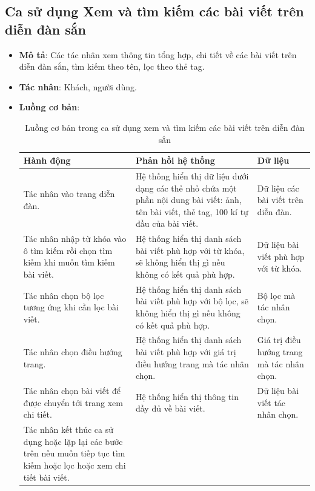 \documentclass[./../main.tex]{subfiles}
\begin{document}
\subsection{Ca sử dụng Xem và tìm kiếm các bài viết trên diễn đàn sắn}
\begin{itemize}
    \item \textbf{Mô tả}: Các tác nhân xem thông tin tổng hợp, chi tiết về các bài viết trên diễn đàn sắn, tìm kiếm theo tên, lọc theo thẻ tag.
    \item \textbf{Tác nhân}: Khách, người dùng.
    \item \textbf{Luồng cơ bản}:
    \begin{table}[H]
    \caption{\label{uc-28}Luồng cơ bản trong ca sử dụng xem và tìm kiếm các bài viết trên diễn đàn sắn}
    \begin{tabularx}{\textwidth}{| X | X | X |}
        \hline
        \textbf{Hành động} & \textbf{Phản hồi hệ thống} & \textbf{Dữ liệu} \\ \hline
        Tác nhân vào trang diễn đàn. & Hệ thống hiển thị dữ liệu dưới dạng các thẻ nhỏ chứa một phần nội dung bài viết: ảnh, tên bài viết, thẻ tag, 100 kí tự đầu của bài viết. & Dữ liệu các bài viết trên diễn đàn.
        \\ \hline
        Tác nhân nhập từ khóa vào ô tìm kiếm rồi chọn tìm kiếm khi muốn tìm kiếm bài viết. & Hệ thống hiển thị danh sách bài viết phù hợp với từ khóa, sẽ không hiển thị gì nếu không có kết quả phù hợp. & Dữ liệu bài viết phù hợp với từ khóa.
        \\ \hline
        Tác nhân chọn bộ lọc tương ứng khi cần lọc bài viết. & Hệ thống hiển thị danh sách bài viết phù hợp với bộ lọc, sẽ không hiển thị gì nếu không có kết quả phù hợp. & Bộ lọc mà tác nhân chọn.
        \\ \hline
        Tác nhân chọn điều hướng trang. & Hệ thống hiển thị danh sách bài viết phù hợp với giá trị điều hướng trang mà tác nhân chọn. & Giá trị điều hướng trang mà tác nhân chọn.
        \\ \hline
        Tác nhân chọn bài viết để được chuyển tới trang xem chi tiết. & Hệ thống hiển thị thông tin đầy đủ về bài viết. & Dữ liệu bài viết tác nhân chọn.
        \\ \hline
        Tác nhân kết thúc ca sử dụng hoặc lặp lại các bước trên nếu muốn tiếp tục tìm kiếm hoặc lọc hoặc xem chi tiết bài viết. & &
        \\ \hline
    \end{tabularx}
    \end{table}    

\end{itemize}
\end{document}
